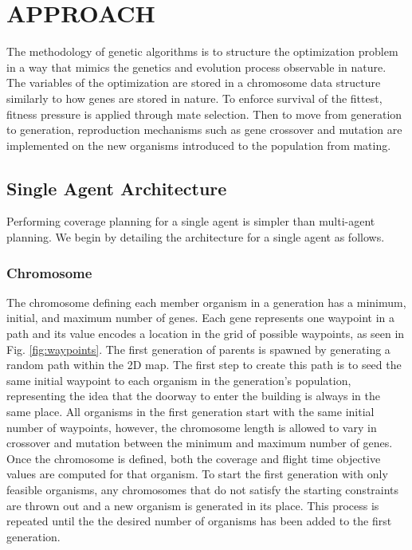 \documentclass[letterpaper, 10 pt, conference]{ieeeconf}  %
\begin{document}
\section{APPROACH}\label{approach}

The methodology of genetic algorithms is to structure the optimization problem in a way that mimics the genetics and evolution process observable in nature. The variables of the optimization are stored in a chromosome data structure similarly to how genes are stored in nature. To enforce survival of the fittest, fitness pressure is applied through mate selection. Then to move from generation to generation, reproduction mechanisms such as gene crossover and mutation are implemented on the new organisms introduced to the population from mating.

\subsection{Single Agent Architecture}

Performing coverage planning for a single agent is simpler than multi-agent planning. We begin by detailing the architecture for a single agent as follows.

\subsubsection{Chromosome}

The chromosome defining each member organism in a generation has a minimum, initial, and maximum number of genes. Each gene represents one waypoint in a path and its value encodes a location in the grid of possible waypoints, as seen in Fig. \ref{fig:waypoints}. The first generation of parents is spawned by generating a random path within the 2D map. The first step to create this path is to seed the same initial waypoint to each organism in the generation's population, representing the idea that the doorway to enter the building is always in the same place. All organisms in the first generation start with the same initial number of waypoints, however, the chromosome length is allowed to vary in crossover and mutation between the minimum and maximum number of genes. Once the chromosome is defined, both the coverage and flight time objective values are computed for that organism. To start the first generation with only feasible organisms, any chromosomes that do not satisfy the starting constraints are thrown out and a new organism is generated in its place. This process is repeated until the the desired number of organisms has been added to the first generation.
\end{document}
